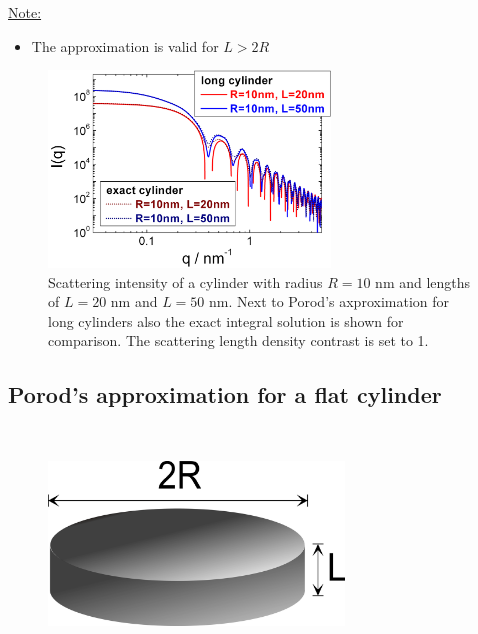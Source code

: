 \underline{Note:}
\begin{itemize}
\item The approximation is valid for $L>2R$
\end{itemize}

\begin{figure}[htb]
\begin{center}
\includegraphics[width=0.668\textwidth,height=0.488\textwidth]{../images/form_factor/cylindrical_obj/LongCylinder.png}
\end{center}
\caption{Scattering intensity of a cylinder with radius $R=10$ nm and lengths of $L=20$ nm
and $L=50$ nm. Next to Porod's axproximation for long cylinders also
the exact integral solution is shown for comparison.
The scattering length density contrast is set to 1.}
\label{fig:LongCylinder}
\end{figure}


\clearpage
\subsection{Porod's approximation for a flat cylinder \cite{Porod1948}}
\label{sect:flatCylinder}
~\\

\begin{figure}[htb]
\begin{center}
\includegraphics[width=0.7\textwidth,height=0.42\textwidth]{../images/form_factor/cylindrical_obj/flat_cylinder.png}
\end{center}
\caption{} \label{flatcylinder}
\end{figure}

